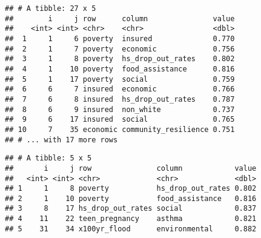 \documentclass[
]{article}
\newenvironment{Shaded}{\begin{snugshade}}{\end{snugshade}}
\newcommand{\DecValTok}[1]{\textcolor[rgb]{0.00,0.00,0.81}{#1}}
\newcommand{\FloatTok}[1]{\textcolor[rgb]{0.00,0.00,0.81}{#1}}
\newcommand{\KeywordTok}[1]{\textcolor[rgb]{0.13,0.29,0.53}{\textbf{#1}}}
\newcommand{\NormalTok}[1]{#1}
\newcommand{\OperatorTok}[1]{\textcolor[rgb]{0.81,0.36,0.00}{\textbf{#1}}}
\newcommand{\StringTok}[1]{\textcolor[rgb]{0.31,0.60,0.02}{#1}}
\begin{document}
\begin{Shaded}
\end{Shaded}

\begin{verbatim}
## # A tibble: 27 x 5
##        i     j row      column               value
##    <int> <int> <chr>    <chr>                <dbl>
##  1     1     6 poverty  insured              0.770
##  2     1     7 poverty  economic             0.756
##  3     1     8 poverty  hs_drop_out_rates    0.802
##  4     1    10 poverty  food_assistance      0.816
##  5     1    17 poverty  social               0.759
##  6     6     7 insured  economic             0.766
##  7     6     8 insured  hs_drop_out_rates    0.787
##  8     6     9 insured  non_white            0.737
##  9     6    17 insured  social               0.765
## 10     7    35 economic community_resilience 0.751
## # ... with 17 more rows
\end{verbatim}

\begin{Shaded}
\end{Shaded}

\begin{verbatim}
## # A tibble: 5 x 5
##       i     j row               column            value
##   <int> <int> <chr>             <chr>             <dbl>
## 1     1     8 poverty           hs_drop_out_rates 0.802
## 2     1    10 poverty           food_assistance   0.816
## 3     8    17 hs_drop_out_rates social            0.837
## 4    11    22 teen_pregnancy    asthma            0.821
## 5    31    34 x100yr_flood      environmental     0.882
\end{verbatim}
\end{document}
